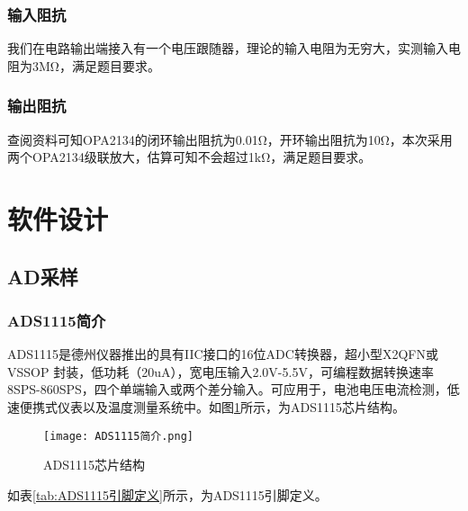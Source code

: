 \documentclass[lang=cn,11pt,a4paper]{elegantpaper}
\begin{document}
\subsubsection{输入阻抗}
我们在电路输出端接入有一个电压跟随器，理论的输入电阻为无穷大，实测输入电阻为3MΩ，满足题目要求。


\subsubsection{输出阻抗}
查阅资料可知OPA2134的闭环输出阻抗为0.01Ω，开环输出阻抗为10Ω，本次采用两个OPA2134级联放大，估算可知不会超过1kΩ，满足题目要求。


\section{软件设计}

\subsection{AD采样}
\subsubsection{ADS1115简介}
ADS1115是德州仪器推出的具有IIC接口的16位ADC转换器，超小型X2QFN或VSSOP 封装，低功耗（20uA），宽电压输入2.0V-5.5V，可编程数据转换速率8SPS-860SPS，四个单端输入或两个差分输入。可应用于，电池电压电流检测，低速便携式仪表以及温度测量系统中。如图\ref{fig:ADS1115芯片结构}所示，为ADS1115芯片结构。
\begin{figure}[!htb]
  \centering
  \texttt{[image: ADS1115简介.png]}
  \caption{ADS1115芯片结构}
  \label{fig:ADS1115芯片结构}
\end{figure}

如表\ref{tab:ADS1115引脚定义}所示，为ADS1115引脚定义。
\end{document}
